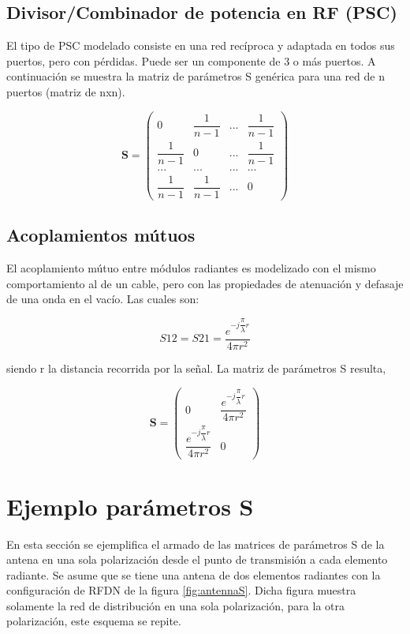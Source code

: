 \subsection{Divisor/Combinador de potencia en RF (PSC)}

El tipo de PSC modelado consiste en una red recíproca y adaptada en todos sus puertos, pero con pérdidas. Puede ser un
componente de 3 o más puertos. A continuación se muestra la matriz de parámetros S genérica para una red de n puertos
(matriz de nxn).

$$
\mathbf{S} = \begin{pmatrix} 0 & \dfrac{1}{n-1} & ... & \dfrac{1}{n-1}\\
							 \dfrac{1}{n-1} & 0 & ... & \dfrac{1}{n-1}\\
							 ... & ... & ... & ... \\
							 \dfrac{1}{n-1} & \dfrac{1}{n-1} & ... & 0 \end{pmatrix}
$$

\subsection{Acoplamientos mútuos}

El acoplamiento mútuo entre módulos radiantes es modelizado con el mismo comportamiento al de un cable, pero con las
propiedades de atenuación y defasaje de una onda en el vacío. Las cuales son:

\begin{equation}
	S12 = S21 = \dfrac{e^{-j\dfrac{\pi}{\lambda}r}}{4\pi r^2}
\end{equation}

siendo r la distancia recorrida por la señal. La matriz de parámetros S resulta,

$$
\mathbf{S} = \begin{pmatrix} 0 & \dfrac{e^{-j\dfrac{\pi}{\lambda}r}}{4\pi r^2}\\\dfrac{e^{-j\dfrac{\pi}{\lambda}r}}{4\pi r^2} & 0\end{pmatrix}
$$

\section{Ejemplo parámetros S}

En esta sección se ejemplifica el armado de las matrices de parámetros S de la antena en una sola polarización desde el punto 
de transmisión a cada elemento radiante. Se asume que se tiene una antena de dos elementos radiantes con la configuración de 
RFDN de la figura \ref{fig:antennaS}. Dicha figura muestra solamente la red de distribución en una sola polarización, para la 
otra polarización, este esquema se repite.

